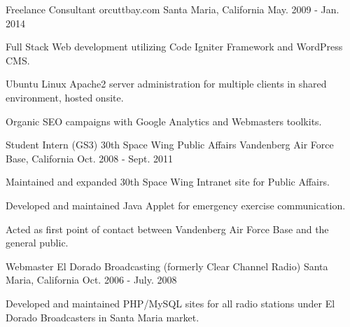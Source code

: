 \begin{cventries}
  \cventry
    {Freelance Consultant} %
    {orcuttbay.com} %
    {Santa Maria, California} %
    {May. 2009 - Jan. 2014} %
    {
      \begin{cvitems} %
        \item {Full Stack Web development utilizing Code Igniter Framework and WordPress CMS.}
        \item {Ubuntu Linux Apache2 server administration for multiple clients in shared environment, hosted onsite. }
        \item {Organic SEO campaigns with Google Analytics and Webmasters toolkits.}
      \end{cvitems}
    }

  \cventry
    {Student Intern (GS3)} %
    {30th Space Wing Public Affairs} %
    {Vandenberg Air Force Base, California} %
    {Oct. 2008 - Sept. 2011} %
    {
      \begin{cvitems} %
        \item {Maintained and expanded 30th Space Wing Intranet site for Public Affairs.}
        \item {Developed and maintained Java Applet for emergency exercise communication.}
        \item {Acted as first point of contact between Vandenberg Air Force Base and the general public.}
      \end{cvitems}
    }

  \cventry
    {Webmaster} %
    {El Dorado Broadcasting (formerly Clear Channel Radio)} %
    {Santa Maria, California} %
    {Oct. 2006 - July. 2008} %
    {
      \begin{cvitems} %
        \item {Developed and maintained PHP/MySQL sites for all radio stations under El Dorado Broadcasters in Santa Maria market.}
      \end{cvitems}
    }



\end{cventries}
